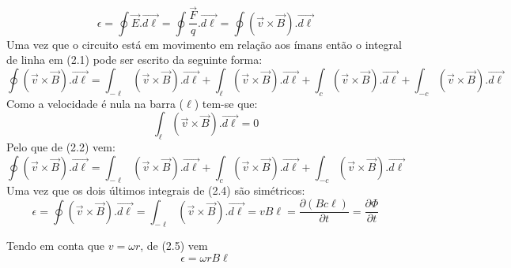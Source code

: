 \documentclass[11pt]{report}
\begin{document}
\begin{equation} \epsilon = \oint \overrightarrow{E}.\overrightarrow{d\ell} = \oint \frac{\overrightarrow{F}}{q}.\overrightarrow{d\ell} = \oint(\overrightarrow{v} \times \overrightarrow{B}).\overrightarrow{d\ell}\end{equation}
Uma vez que o circuito está em movimento em relação aos ímans então o integral de linha em (2.1) pode ser escrito da seguinte forma:\\
\begin{equation}
	\oint(\overrightarrow{v} \times \overrightarrow{B}).\overrightarrow{d\ell} = \int_{-\ell}(\overrightarrow{v} \times \overrightarrow{B}).\overrightarrow{d\ell} + \int_{\ell} (\overrightarrow{v} \times \overrightarrow{B}).\overrightarrow{d\ell} + \int_{c} (\overrightarrow{v} \times \overrightarrow{B}).\overrightarrow{d\ell} + \int_{-c}(\overrightarrow{v} \times \overrightarrow{B}).\overrightarrow{d\ell}
\end{equation}
Como a velocidade é nula na barra ($\ell$) tem-se que:
\begin{equation}
	\int_{\ell} (\overrightarrow{v} \times \overrightarrow{B}).\overrightarrow{d\ell} = 0\end{equation}
Pelo que de (2.2) vem:
\begin{equation}\oint(\overrightarrow{v} \times \overrightarrow{B}).\overrightarrow{d\ell} = \int_{-\ell}(\overrightarrow{v} \times \overrightarrow{B}).\overrightarrow{d\ell} +  \int_{c} (\overrightarrow{v} \times \overrightarrow{B}).\overrightarrow{d\ell} + \int_{-c} (\overrightarrow{v} \times \overrightarrow{B}).\overrightarrow{d\ell}
\end{equation}
Uma vez que os dois últimos integrais de (2.4) são simétricos:
\begin{equation}
	\epsilon = \oint(\overrightarrow{v} \times \overrightarrow{B}).\overrightarrow{d\ell} = \int_{-\ell}(\overrightarrow{v} \times \overrightarrow{B}).\overrightarrow{d\ell} = vB\ell=\frac{\partial (Bc\ell)}{\partial t}= \frac{\partial \Phi}{\partial t}
\end{equation}

Tendo em conta que $v=\omega r$, de (2.5) vem
\begin{equation}
	\epsilon = \omega rB\ell
\end{equation}

\end{document}
